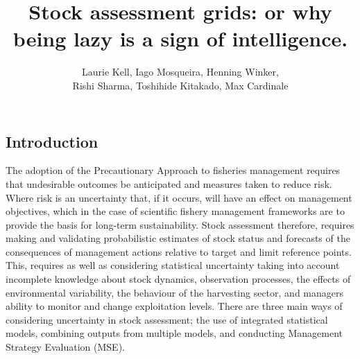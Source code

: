 \documentclass[a4paper]{article}
\title{Stock assessment grids: or why being lazy is a sign of intelligence.}
\author{Laurie Kell, Iago Mosqueira, Henning Winker, \\Rishi Sharma, Toshihide  Kitakado, Max Cardinale}
\begin{document}
\maketitle

\begin{abstract}


\end{abstract}

\newpage
\subsection*{Introduction}

The adoption of the Precautionary Approach to fisheries management \citep[PA,][]{garcia1996precautionary} requires that undesirable outcomes be anticipated and measures taken to reduce risk. Where risk is an uncertainty that, if it occurs, will have an effect on management objectives, which in the case of scientific fishery management frameworks are to provide the basis for long-term sustainability. Stock assessment therefore, requires making and validating probabilistic estimates of stock status and forecasts of the consequences of management actions relative to target and limit reference points. This, requires as well as considering statistical uncertainty taking into account incomplete knowledge about stock dynamics, observation processes, the effects of environmental variability, the behaviour of the harvesting sector, and managers ability to monitor and change exploitation levels. There are three main ways of considering uncertainty in stock assessment; the use of integrated statistical models, combining outputs from multiple models, and conducting Management Strategy Evaluation (MSE).
\end{document}

